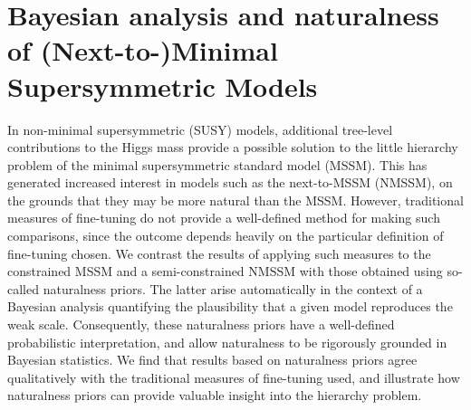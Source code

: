 \documentclass[12pt,a4paper]{article}
\begin{document}
\section*{Bayesian analysis and naturalness of (Next-to-)Minimal
  Supersymmetric Models}
In non-minimal supersymmetric (SUSY) models, additional tree-level
contributions to the Higgs mass provide a possible solution to the little
hierarchy problem of the minimal supersymmetric standard model (MSSM).  This
has generated increased interest in models such as the next-to-MSSM (NMSSM),
on the grounds that they may be more natural than the MSSM.  However,
traditional measures of fine-tuning do not provide a well-defined method for
making such comparisons, since the outcome depends heavily on the particular
definition of fine-tuning chosen.  We contrast the results of applying such
measures to the constrained MSSM and a semi-constrained NMSSM with those
obtained using so-called naturalness priors.  The latter arise automatically
in the context of a Bayesian analysis quantifying the plausibility that a
given model reproduces the weak scale.  Consequently, these naturalness priors
have a well-defined probabilistic interpretation, and allow naturalness to
be rigorously grounded in Bayesian statistics.  We find that results based
on naturalness priors agree qualitatively with the traditional measures of
fine-tuning used, and illustrate how naturalness priors can provide
valuable insight into the hierarchy problem.
\end{document}
